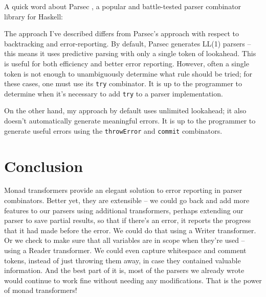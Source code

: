 \documentclass{tmr}
\begin{document}
A quick word about Parsec \cite{leijen}, a popular and battle-tested parser 
combinator library for Haskell:

The approach I've described differs from Parsec's approach with respect to 
backtracking and error-reporting.  By default, Parsec generates LL(1) parsers --
this means it uses predictive parsing with only a single token of lookahead.  This
is useful for both efficiency and better error reporting.  However, often a 
single token is not enough to unambiguously determine what rule should be tried;
for these cases, one must use its \verb+try+ combinator.  It is up to the
programmer to determine when it's necessary to add \verb+try+ to a parser
implementation.

On the other hand, my approach by default uses unlimited lookahead; it also 
doesn't automatically generate meaningful errors.  It is up to the programmer 
to generate useful errors using the \verb+throwError+ and \verb+commit+ 
combinators.




\section{Conclusion}
Monad transformers provide an elegant solution to error reporting in parser
combinators.  Better yet, they are extensible -- we could go back and add more
features to our parsers using additional transformers, perhaps extending our
parser to save partial results, so that if there's an error, it reports the
progress that it had made before the error.  We could do that using a Writer
transformer.  Or we check to make sure that all variables are in scope when
they're used -- using a Reader transformer.  We could even capture whitespace
and comment tokens, instead of just throwing them away, in case they contained
valuable information.  And the best part of it is, most of the parsers we already
wrote would continue to work fine without needing any modifications.  That
is the power of monad transformers!





\end{document}
